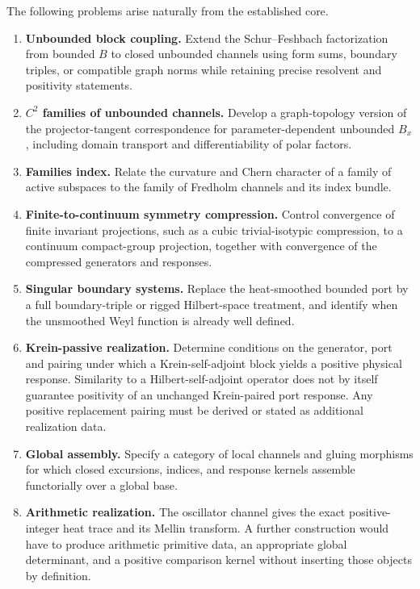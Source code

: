 \documentclass[11pt,reqno]{scrartcl}
\theoremstyle{plain}
\theoremstyle{definition}
\theoremstyle{remark}
\begin{document}
The following problems arise naturally from the established core.

\begin{enumerate}[label=\textbf{G\arabic*.},leftmargin=3.5em]
  \item \textbf{Unbounded block coupling.}
  Extend the Schur--Feshbach factorization from bounded \(B\) to closed
  unbounded channels using form sums, boundary triples, or compatible graph
  norms while retaining precise resolvent and positivity statements.

  \item \textbf{\(C^2\) families of unbounded channels.}
  Develop a graph-topology version of the projector-tangent correspondence for
  parameter-dependent unbounded \(B_x\), including domain transport and
  differentiability of polar factors.

  \item \textbf{Families index.}
  Relate the curvature and Chern character of a family of active subspaces to
  the family of Fredholm channels and its index bundle.

  \item \textbf{Finite-to-continuum symmetry compression.}
  Control convergence of finite invariant projections, such as a cubic
  trivial-isotypic compression, to a continuum compact-group projection,
  together with convergence of the compressed generators and responses.

  \item \textbf{Singular boundary systems.}
  Replace the heat-smoothed bounded port by a full boundary-triple or rigged
  Hilbert-space treatment, and identify when the unsmoothed Weyl function is
  already well defined.

  \item \textbf{Krein-passive realization.}
  Determine conditions on the generator, port and pairing under which
  a Krein-self-adjoint block yields a positive physical response.
  Similarity to a Hilbert-self-adjoint operator does not by itself
  guarantee positivity of an unchanged Krein-paired port response.
  Any positive replacement pairing must be derived or stated as
  additional realization data.

  \item \textbf{Global assembly.}
  Specify a category of local channels and gluing morphisms for which closed
  excursions, indices, and response kernels assemble functorially over a
  global base.

  \item \textbf{Arithmetic realization.}
  The oscillator channel gives the exact positive-integer heat trace and its
  Mellin transform.  A further construction would have to produce arithmetic
  primitive data, an appropriate global determinant, and a positive
  comparison kernel without inserting those objects by definition.
\end{enumerate}
\end{document}
